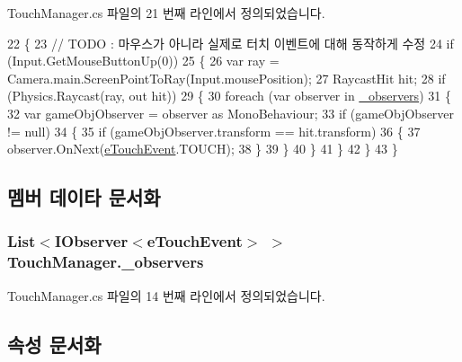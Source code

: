 Touch\+Manager.\+cs 파일의 21 번째 라인에서 정의되었습니다.


\begin{DoxyCode}
22     \{
23         \textcolor{comment}{// TODO : 마우스가 아니라 실제로 터치 이벤트에 대해 동작하게 수정}
24         \textcolor{keywordflow}{if} (Input.GetMouseButtonUp(0))
25         \{
26             var ray = Camera.main.ScreenPointToRay(Input.mousePosition);
27             RaycastHit hit;
28             \textcolor{keywordflow}{if} (Physics.Raycast(ray, out hit))
29             \{
30                 \textcolor{keywordflow}{foreach} (var observer \textcolor{keywordflow}{in} \hyperlink{class_touch_manager_a90d8ccdafc722f2d17dd0c7c818631c4}{\_observers})
31                 \{
32                     var gameObjObserver = observer as MonoBehaviour;
33                     \textcolor{keywordflow}{if} (gameObjObserver != null)
34                     \{
35                         \textcolor{keywordflow}{if} (gameObjObserver.transform == hit.transform)
36                         \{
37                             observer.OnNext(\hyperlink{_touch_manager_8cs_ae33e321a424fe84ba8b2fdb81ad40a68}{eTouchEvent}.TOUCH);
38                         \}
39                     \}
40                 \}
41             \}
42         \}
43     \}
\end{DoxyCode}


\subsection{멤버 데이타 문서화}
\subsubsection[{\texorpdfstring{\+\_\+observers}{_observers}}]{\setlength{\rightskip}{0pt plus 5cm}List$<${\bf I\+Observer}$<${\bf e\+Touch\+Event}$>$ $>$ Touch\+Manager.\+\_\+observers\hspace{0.3cm}{\ttfamily [private]}}\hypertarget{class_touch_manager_a90d8ccdafc722f2d17dd0c7c818631c4}{}\label{class_touch_manager_a90d8ccdafc722f2d17dd0c7c818631c4}


Touch\+Manager.\+cs 파일의 14 번째 라인에서 정의되었습니다.



\subsection{속성 문서화}
